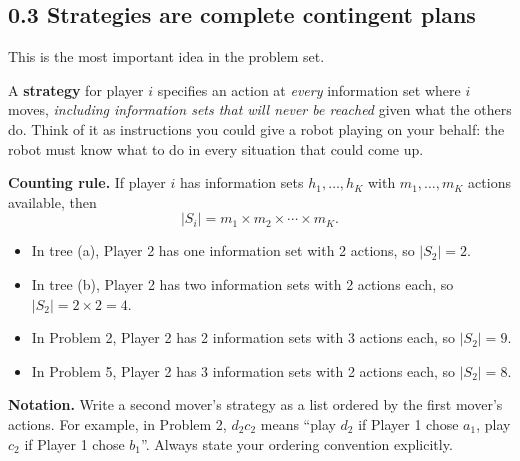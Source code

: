 \documentclass[11pt]{article}
\begin{document}
\subsection*{0.3 Strategies are complete contingent plans}
This is the most important idea in the problem set.

\begin{keyidea}[Strategy]
A \textbf{strategy} for player $i$ specifies an action at \emph{every} information set where $i$ moves, \emph{including information sets that will never be reached} given what the others do. Think of it as instructions you could give a robot playing on your behalf: the robot must know what to do in every situation that could come up.
\end{keyidea}

\textbf{Counting rule.} If player $i$ has information sets $h_1,\dots,h_K$ with $m_1,\dots,m_K$ actions available, then
\[
|S_i| = m_1\times m_2\times\cdots\times m_K .
\]
\begin{itemize}
\item In tree (a), Player 2 has one information set with 2 actions, so $|S_2|=2$.
\item In tree (b), Player 2 has two information sets with 2 actions each, so $|S_2|=2\times2=4$.
\item In Problem 2, Player 2 has 2 information sets with 3 actions each, so $|S_2|=9$.
\item In Problem 5, Player 2 has 3 information sets with 2 actions each, so $|S_2|=8$.
\end{itemize}
\textbf{Notation.} Write a second mover's strategy as a list ordered by the first mover's actions. For example, in Problem 2, $d_2c_2$ means ``play $d_2$ if Player 1 chose $a_1$, play $c_2$ if Player 1 chose $b_1$''. Always state your ordering convention explicitly.
\end{document}

